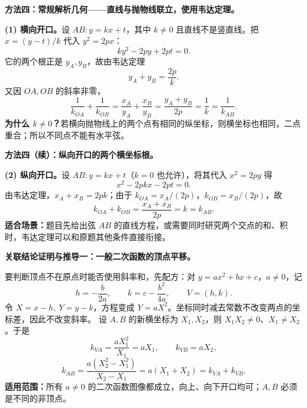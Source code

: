 \clearpage
\begin{proofbox}
\textbf{方法四：常规解析几何——直线与抛物线联立，使用韦达定理。}
\begin{center}\end{center}

\textbf{(1) 横向开口。}设 $AB:y=kx+t$，其中 $k\ne0$ 且直线不是竖直线。把 $x=(y-t)/k$ 代入 $y^2=2px$：
\[
ky^2-2py+2pt=0.
\]
它的两个根正是 $y_A,y_B$，故由韦达定理
\[
y_A+y_B=\frac{2p}{k}.
\]
又因 $OA,OB$ 的斜率非零，
\[
\frac1{k_{OA}}+\frac1{k_{OB}}
=\frac{x_A}{y_A}+\frac{x_B}{y_B}
=\frac{y_A+y_B}{2p}
=\frac1k=\frac1{k_{AB}}.
\]
\textbf{为什么 $k\ne0$？}若横向抛物线上的两个点有相同的纵坐标，则横坐标也相同，二点重合；所以不同点不能有水平弦。

\end{proofbox}
\clearpage
\begin{proofbox}
\textbf{方法四（续）：纵向开口的两个横坐标根。}
\begin{center}\end{center}
\textbf{(2) 纵向开口。}设 $AB:y=kx+t$（$k=0$ 也允许），将其代入 $x^2=2py$ 得
\[
x^2-2pkx-2pt=0.
\]
由韦达定理，$x_A+x_B=2pk$；由于 $k_{OA}=x_A/(2p)$，$k_{OB}=x_B/(2p)$，故
\[
\boxed{k_{OA}+k_{OB}=\frac{x_A+x_B}{2p}=k=k_{AB}}.
\]
\textbf{适合场景：}题目先给出弦 $AB$ 的直线方程，或需要同时研究两个交点的和、积时，韦达定理可以和原题其他条件直接衔接。
\end{proofbox}

\clearpage
\begin{proofbox}
\textbf{关联结论证明与推导一：一般二次函数的顶点平移。}
\begin{center}\end{center}
要判断顶点不在原点时能否使用斜率和，先配方：对 $y=ax^2+bx+c$，$a\ne0$，记
\[
h=-\frac b{2a},\qquad k=c-\frac{b^2}{4a},\qquad V=(h,k).
\]
令 $X=x-h,\ Y=y-k$，方程变成 $Y=aX^2$。坐标同时减去常数不改变两点的坐标差，因此不改变斜率。
设 $A,B$ 的新横坐标为 $X_1,X_2$，则 $X_1X_2\ne0$、$X_1\ne X_2$。于是
\[
k_{VA}=\frac{aX_1^2}{X_1}=aX_1,\qquad k_{VB}=aX_2,
\]
\[
k_{AB}=\frac{a(X_2^2-X_1^2)}{X_2-X_1}
=a(X_1+X_2)=\boxed{k_{VA}+k_{VB}}.
\]
\textbf{适用范围：}所有 $a\ne0$ 的二次函数图像都成立，向上、向下开口均可；$A,B$ 必须是不同的非顶点。
\end{proofbox}

